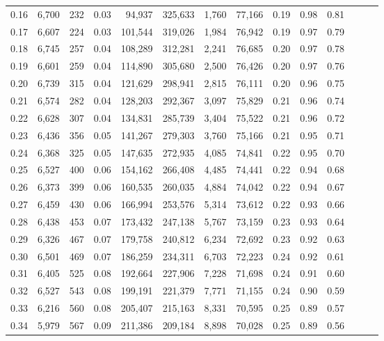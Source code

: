 \begin{tabular}{rrrrrrrrrrrrrr}
0.16 &  6,700 &    232 &  0.03 &   94,937 &  325,633 &   1,760 &  77,166 &  0.19 &  0.98 &      0.81 \\
0.17 &  6,607 &    224 &  0.03 &  101,544 &  319,026 &   1,984 &  76,942 &  0.19 &  0.97 &      0.79 \\
0.18 &  6,745 &    257 &  0.04 &  108,289 &  312,281 &   2,241 &  76,685 &  0.20 &  0.97 &      0.78 \\
0.19 &  6,601 &    259 &  0.04 &  114,890 &  305,680 &   2,500 &  76,426 &  0.20 &  0.97 &      0.76 \\
0.20 &  6,739 &    315 &  0.04 &  121,629 &  298,941 &   2,815 &  76,111 &  0.20 &  0.96 &      0.75 \\
0.21 &  6,574 &    282 &  0.04 &  128,203 &  292,367 &   3,097 &  75,829 &  0.21 &  0.96 &      0.74 \\
0.22 &  6,628 &    307 &  0.04 &  134,831 &  285,739 &   3,404 &  75,522 &  0.21 &  0.96 &      0.72 \\
0.23 &  6,436 &    356 &  0.05 &  141,267 &  279,303 &   3,760 &  75,166 &  0.21 &  0.95 &      0.71 \\
0.24 &  6,368 &    325 &  0.05 &  147,635 &  272,935 &   4,085 &  74,841 &  0.22 &  0.95 &      0.70 \\
0.25 &  6,527 &    400 &  0.06 &  154,162 &  266,408 &   4,485 &  74,441 &  0.22 &  0.94 &      0.68 \\
0.26 &  6,373 &    399 &  0.06 &  160,535 &  260,035 &   4,884 &  74,042 &  0.22 &  0.94 &      0.67 \\
0.27 &  6,459 &    430 &  0.06 &  166,994 &  253,576 &   5,314 &  73,612 &  0.22 &  0.93 &      0.66 \\
0.28 &  6,438 &    453 &  0.07 &  173,432 &  247,138 &   5,767 &  73,159 &  0.23 &  0.93 &      0.64 \\
0.29 &  6,326 &    467 &  0.07 &  179,758 &  240,812 &   6,234 &  72,692 &  0.23 &  0.92 &      0.63 \\
0.30 &  6,501 &    469 &  0.07 &  186,259 &  234,311 &   6,703 &  72,223 &  0.24 &  0.92 &      0.61 \\
0.31 &  6,405 &    525 &  0.08 &  192,664 &  227,906 &   7,228 &  71,698 &  0.24 &  0.91 &      0.60 \\
0.32 &  6,527 &    543 &  0.08 &  199,191 &  221,379 &   7,771 &  71,155 &  0.24 &  0.90 &      0.59 \\
0.33 &  6,216 &    560 &  0.08 &  205,407 &  215,163 &   8,331 &  70,595 &  0.25 &  0.89 &      0.57 \\
0.34 &  5,979 &    567 &  0.09 &  211,386 &  209,184 &   8,898 &  70,028 &  0.25 &  0.89 &      0.56 \\

\end{tabular}
